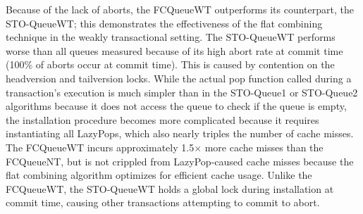 Because of the lack of aborts, the FCQueueWT outperforms its counterpart, the STO-QueueWT; this demonstrates the effectiveness of the flat combining technique in the weakly transactional setting. The STO-QueueWT performs worse than all queues measured because of its high abort rate at commit time (100\% of aborts occur at commit time). This is caused by contention on the headversion and tailversion locks. While the actual pop function called during a transaction's execution is much simpler than in the STO-Queue1 or STO-Queue2 algorithms because it does not access the queue to check if the queue is empty, the installation procedure becomes more complicated because it requires instantiating all LazyPops, which also nearly triples the number of cache misses. The FCQueueWT incurs approximately 1.5$\times$ more cache misses than the FCQueueNT, but is not crippled from LazyPop-caused cache misses because the flat combining algorithm optimizes for efficient cache usage. Unlike the FCQueueWT, the STO-QueueWT holds a global lock during installation at commit time, causing other transactions attempting to commit to abort.
